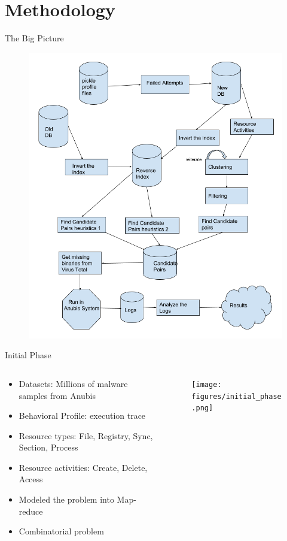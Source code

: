 \documentclass{beamer}
\begin{document}
\section{Methodology}
\label{sec:Methodology}
\begin{frame}[h]{The Big Picture}
  \begin{figure}[h]
    \centering
    \includegraphics[scale=0.25]{figures/bigpicture.png}
  \label{fig:malware_type}
  \end{figure}
\end{frame}
\begin{frame}[h]{Initial Phase}
  \begin{columns}
    \begin{column}{5cm}
      \begin{itemize}
        \item Datasets: Millions of malware samples from Anubis
        \item Behavioral Profile: execution trace
        \item Resource types: File, Registry, Sync, Section, Process
        \item Resource activities: Create, Delete, Access
        \item Modeled the problem into Map-reduce
        \item Combinatorial problem
      \end{itemize}
    \end{column}
    \begin{column}{5cm}
      \begin{figure}[h]
        \centering
        \texttt{[image: figures/initial\_phase.png]}
      \label{fig:malware_type}
      \end{figure}
    \end{column}
  \end{columns}
\end{frame}
\end{document}
